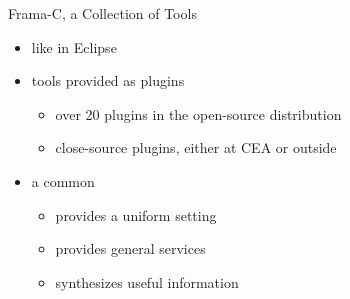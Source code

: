 \begin{frame}{Frama-C, a Collection of Tools}

  \begin{center}
    \large{}
  \end{center}

\begin{itemize}
\item {} like in Eclipse
\medskip
\item tools provided as plugins
  \smallskip
  \begin{itemize}
  \item over 20 plugins in the open-source distribution
  \smallskip
  \smallskip
  \item close-source plugins, either at CEA  or outside
  \end{itemize}
\medskip
\item a common 
  \smallskip
  \begin{itemize}
  \item provides a uniform setting
  \smallskip
  \item provides general services
  \smallskip
  \item synthesizes useful information
  \end{itemize}
\end{itemize}

\end{frame}


